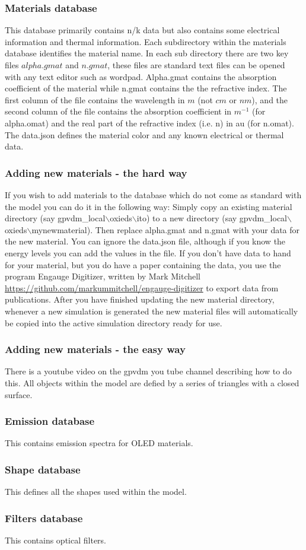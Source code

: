 \subsubsection{Materials database}
This database primarily contains n/k data but also contains some electrical information and thermal information. Each subdirectory within the materials database identifies the material name.  In each sub directory there are two key files $alpha.gmat$ and $n.gmat$, these files are standard text files can be opened with any text editor such as wordpad.    Alpha.gmat contains the absorption coefficient of the material while n.gmat contains the the refractive index.  The first column of the file contains the wavelength in $m$ (not $cm$ or $nm$), and the second column of the file contains the absorption coefficient in $m^{-1}$ (for alpha.omat) and the real part of the refractive index (i.e. n) in au (for n.omat). The data.json defines the material color and any known electrical or thermal data.


\subsubsection{Adding new materials - the hard way}
If you wish to add materials to the database which do not come as standard with the model you can do it in the following way:  Simply copy an existing material directory (say gpvdm\_local$\backslash$oxieds$\backslash$ito) to a new directory (say gpvdm\_local$\backslash$oxieds$\backslash$mynewmaterial).  Then replace alpha.gmat and n.gmat with your data for the new material. You can ignore the data.json file, although if you know the energy levels you can add the values in the file.
\newline
\newline
If you don't have data to hand for your material, but you do have a paper containing the data, you use the program Engauge Digitizer, written by  Mark Mitchell \url{https://github.com/markummitchell/engauge-digitizer} to export data from publications.  After you have finished updating the new material directory, whenever a new simulation is generated the new material files will automatically be copied into the active simulation directory ready for use. 

\subsubsection{Adding new materials - the easy way}
There is a youtube video on the gpvdm you tube channel describing how to do this. All objects within the model are defied by a series of triangles with a closed surface.

\subsubsection{Emission database}
This contains emission spectra for OLED materials.

\subsubsection{Shape database}
This defines all the shapes used within the model.

\subsubsection{Filters database}
This contains optical filters.

